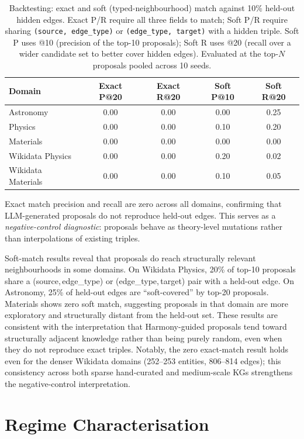 \begin{table}[t]
\centering
\caption{Backtesting: exact and soft (typed-neighbourhood) match against 10\%
held-out hidden edges.  Exact P/R require all three fields to match; Soft P/R
require sharing \texttt{(source, edge\_type)} or \texttt{(edge\_type, target)}
with a hidden triple.  Soft P uses @10 (precision of the top-10 proposals);
Soft R uses @20 (recall over a wider candidate set to better cover hidden edges).
Evaluated at the top-$N$ proposals pooled across 10 seeds.}\label{tab:backtest}
\small
\begin{tabular}{lcccc}
\toprule
Domain & Exact P@20 & Exact R@20 & Soft P@10 & Soft R@20 \\
\midrule
Astronomy         & 0.00 & 0.00 & 0.00 & 0.25 \\
Physics           & 0.00 & 0.00 & 0.10 & 0.20 \\
Materials         & 0.00 & 0.00 & 0.00 & 0.00 \\
Wikidata Physics  & 0.00 & 0.00 & 0.20 & 0.02 \\
Wikidata Materials & 0.00 & 0.00 & 0.10 & 0.05 \\
\bottomrule
\end{tabular}
\end{table}

Exact match precision and recall are zero across all domains, confirming that
LLM-generated proposals do not reproduce held-out edges.  This serves as a
\emph{negative-control diagnostic}: proposals behave as theory-level
mutations rather than interpolations of existing triples.

Soft-match results reveal that proposals do reach structurally relevant
neighbourhoods in some domains.  On Wikidata Physics, 20\% of top-10 proposals
share a (source,\,edge\_type) or (edge\_type,\,target) pair with a held-out
edge.  On Astronomy, 25\% of held-out edges are ``soft-covered'' by top-20
proposals.  Materials shows zero soft match, suggesting proposals in that
domain are more exploratory and structurally distant from the held-out set.
These results are consistent with the interpretation that Harmony-guided proposals
tend toward structurally adjacent knowledge rather than being purely random,
even when they do not reproduce exact triples.
Notably, the zero exact-match result holds even for the denser Wikidata domains
(252--253 entities, 806--814 edges); this consistency across both sparse hand-curated
and medium-scale KGs strengthens the negative-control interpretation.

\section{Regime Characterisation}\label{app:regime-detail}

